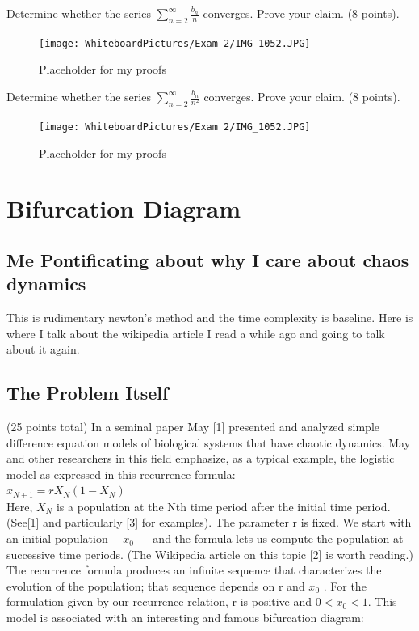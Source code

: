 \newpage
Determine whether the series $\sum_{n=2}^\infty \frac{b_n}{n}$ converges. Prove your claim. (8 points). \\ 
\begin{figure}[h]\begin{center}\texttt{[image: WhiteboardPictures/Exam 2/IMG\_1052.JPG]}
\caption{Placeholder for my proofs} \label{fig:Euler_pic}\end{center}\end{figure} 

\newpage 
Determine whether the series $\sum_{n=2}^\infty \frac{b_n}{n^2}$ converges. Prove your claim. (8 points). \\ 

\begin{figure}[h]\begin{center}\texttt{[image: WhiteboardPictures/Exam 2/IMG\_1052.JPG]}
\caption{Placeholder for my proofs} \label{fig:Euler_pic}\end{center}\end{figure} 

\newpage


\section{Bifurcation Diagram}


\subsection{Me Pontificating about why I care about chaos dynamics}
This is rudimentary newton's method and the time complexity is baseline. Here is where I talk about the wikipedia article I read a while ago and going to talk about it again. 


\subsection{The Problem Itself}
(25 points total) In a seminal paper May [1] presented and analyzed simple difference equation
models of biological systems that have chaotic dynamics. May and other researchers in this field
emphasize, as a typical example, the logistic model as expressed in this recurrence formula: \\ 
$x_{N+1}=rX_N(1-X_N)$ \\ 
Here, $X_N$ is a population at the Nth time period after the initial time period. (See[1] and particularly [3] for examples). The parameter r is fixed. We start with an initial population— $x_0$
 —
and the formula lets us compute the population at successive time periods. (The Wikipedia article
on this topic [2] is worth reading.) The recurrence formula produces an infinite sequence that
characterizes the evolution of the population; that sequence depends on r and $x_0$
.
For the formulation given by our recurrence relation, r is positive and $0 < x_0 < 1$.
This model is associated with an interesting and famous bifurcation diagram: \\ 


